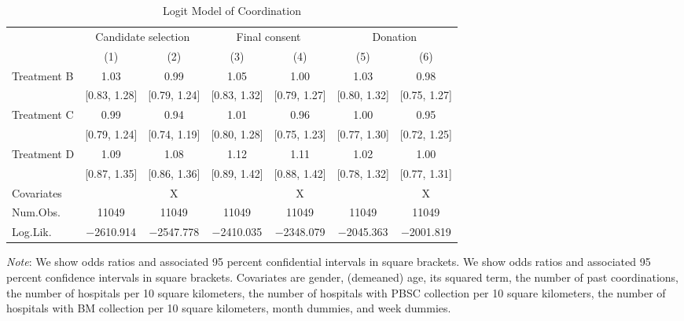 \documentclass[12pt, a4paper]{article}
\begin{document}
\begin{table}[H]

\caption{\label{tab:coordinate-logit}Logit Model of Coordination}
\centering
\fontsize{9}{11}\selectfont
\begin{threeparttable}
\begin{tabular}[t]{lcccccc}
\toprule
\multicolumn{1}{c}{ } & \multicolumn{2}{c}{Candidate selection} & \multicolumn{2}{c}{Final consent} & \multicolumn{2}{c}{Donation} \\
\cmidrule(l{3pt}r{3pt}){2-3} \cmidrule(l{3pt}r{3pt}){4-5} \cmidrule(l{3pt}r{3pt}){6-7}
  & (1) & (2) & (3) & (4) & (5) & (6)\\
\midrule
Treatment B & \num{1.03} & \num{0.99} & \num{1.05} & \num{1.00} & \num{1.03} & \num{0.98}\\
 & {}[\num{0.83}, \num{1.28}] & {}[\num{0.79}, \num{1.24}] & {}[\num{0.83}, \num{1.32}] & {}[\num{0.79}, \num{1.27}] & {}[\num{0.80}, \num{1.32}] & {}[\num{0.75}, \num{1.27}]\\
Treatment C & \num{0.99} & \num{0.94} & \num{1.01} & \num{0.96} & \num{1.00} & \num{0.95}\\
 & {}[\num{0.79}, \num{1.24}] & {}[\num{0.74}, \num{1.19}] & {}[\num{0.80}, \num{1.28}] & {}[\num{0.75}, \num{1.23}] & {}[\num{0.77}, \num{1.30}] & {}[\num{0.72}, \num{1.25}]\\
Treatment D & \num{1.09} & \num{1.08} & \num{1.12} & \num{1.11} & \num{1.02} & \num{1.00}\\
 & {}[\num{0.87}, \num{1.35}] & {}[\num{0.86}, \num{1.36}] & {}[\num{0.89}, \num{1.42}] & {}[\num{0.88}, \num{1.42}] & {}[\num{0.78}, \num{1.32}] & {}[\num{0.77}, \num{1.31}]\\
\midrule
Covariates &  & X &  & X &  & X\\
Num.Obs. & \num{11049} & \num{11049} & \num{11049} & \num{11049} & \num{11049} & \num{11049}\\
Log.Lik. & \num{-2610.914} & \num{-2547.778} & \num{-2410.035} & \num{-2348.079} & \num{-2045.363} & \num{-2001.819}\\
\bottomrule
\end{tabular}
\begin{tablenotes}
\item \emph{Note}: We show odds ratios and associated 95 percent confidential intervals in square brackets. We show odds ratios and associated 95 percent confidence intervals in square brackets. Covariates are gender, (demeaned) age, its squared term, the number of past coordinations, the number of hospitals per 10 square kilometers, the number of hospitals with PBSC collection per 10 square kilometers, the number of hospitals with BM collection per 10 square kilometers, month dummies, and week dummies.
\end{tablenotes}
\end{threeparttable}
\end{table}
\end{document}

